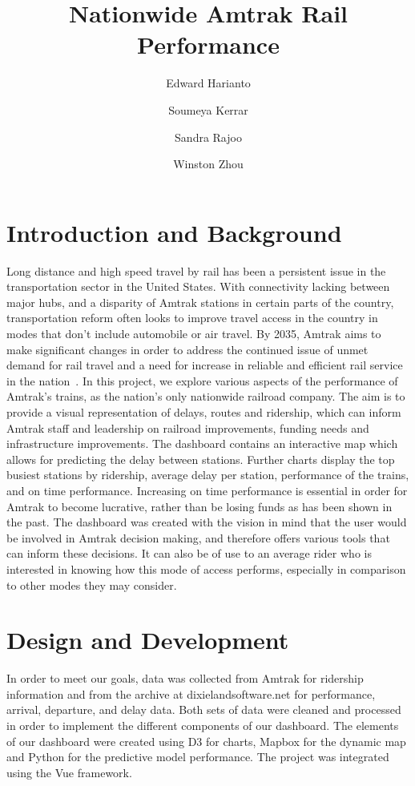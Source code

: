 \documentclass[runningheads]{llncs}
\begin{document}
%
\title{Nationwide Amtrak Rail Performance}
%
%
\author{Edward Harianto \and
Soumeya Kerrar \and
Sandra Rajoo \and Winston Zhou}
%
%
%
\maketitle              %
%
%
%
%
\section{Introduction and Background}
Long distance and high speed travel by rail has been a persistent issue in the transportation sector in the United States. With connectivity lacking between major hubs, and a disparity of Amtrak stations in certain parts of the country, transportation reform often looks to improve travel access in the country in modes that don’t include automobile or air travel. By 2035, Amtrak aims to make significant changes in order to address the continued issue of unmet demand for rail travel and a need for increase in reliable and efficient rail service in the nation~\cite{url}. In this project, we explore various aspects of the performance of Amtrak’s trains, as the nation’s only nationwide railroad company. The aim is to provide a visual representation of delays, routes and ridership, which can inform Amtrak staff and leadership on railroad improvements, funding needs and infrastructure improvements. The dashboard contains an interactive map which allows for predicting the delay between stations. Further charts display the top busiest stations by ridership, average delay per station, performance of the trains, and on time performance. Increasing on time performance is essential in order for Amtrak to become lucrative, rather than be losing funds as has been shown in the past. The dashboard was created with the vision in mind that the user would be involved in Amtrak decision making, and therefore offers various tools that can inform these decisions. It can also be of use to an average rider who is interested in knowing how this mode of access performs, especially in comparison to other modes they may consider.  

\section{Design and Development}
In order to meet our goals, data was collected from Amtrak for ridership information and from the archive at dixielandsoftware.net for performance, arrival, departure, and delay data. Both sets of data were cleaned and processed in order to implement the different components of our dashboard. The elements of our dashboard were created using D3 for charts, Mapbox for the dynamic map and Python for the predictive model performance. The project was integrated using the Vue framework.
\end{document}

